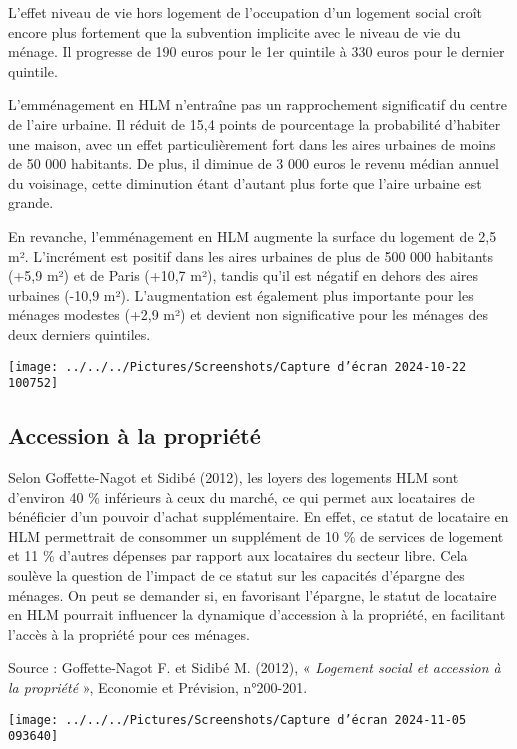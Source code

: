 \documentclass[a4paper, 12pt]{report}
\begin{document}
L’effet niveau de vie hors logement de l’occupation d’un logement social croît encore plus fortement que la subvention implicite avec le niveau de vie du ménage. Il progresse de 190 euros pour le 1er quintile à 330 euros pour le dernier quintile.

L’emménagement en HLM n’entraîne pas un rapprochement significatif du centre de l’aire urbaine. Il réduit de 15,4 points de pourcentage la probabilité d’habiter une maison, avec un effet particulièrement fort dans les aires urbaines de moins de 50 000 habitants. De plus, il diminue de 3 000 euros le revenu médian annuel du voisinage, cette diminution étant d’autant plus forte que l’aire urbaine est grande.

En revanche, l’emménagement en HLM augmente la surface du logement de 2,5 m². L’incrément est positif dans les aires urbaines de plus de 500 000 habitants (+5,9 m²) et de Paris (+10,7 m²), tandis qu’il est négatif en dehors des aires urbaines (-10,9 m²). L’augmentation est également plus importante pour les ménages modestes (+2,9 m²) et devient non significative pour les ménages des deux derniers quintiles.

\begin{center}
	\texttt{[image: ../../../Pictures/Screenshots/Capture d'écran 2024-10-22 100752]}
\end{center}

\subsection{Accession à la propriété}

Selon Goffette-Nagot et Sidibé (2012), les loyers des logements HLM sont d'environ 40 \% inférieurs à ceux du marché, ce qui permet aux locataires de bénéficier d'un pouvoir d'achat supplémentaire. En effet, ce statut de locataire en HLM permettrait de consommer un supplément de 10 \% de services de logement et 11 \% d'autres dépenses par rapport aux locataires du secteur libre. Cela soulève la question de l'impact de ce statut sur les capacités d'épargne des ménages. On peut se demander si, en favorisant l'épargne, le statut de locataire en HLM pourrait influencer la dynamique d'accession à la propriété, en facilitant l'accès à la propriété pour ces ménages.

Source : Goffette-Nagot F. et Sidibé M. (2012), « \textit{Logement social et accession à la
propriété }», Economie et Prévision, n°200-201.
\begin{center}
	\texttt{[image: ../../../Pictures/Screenshots/Capture d'écran 2024-11-05 093640]}
\end{center}
\end{document}
